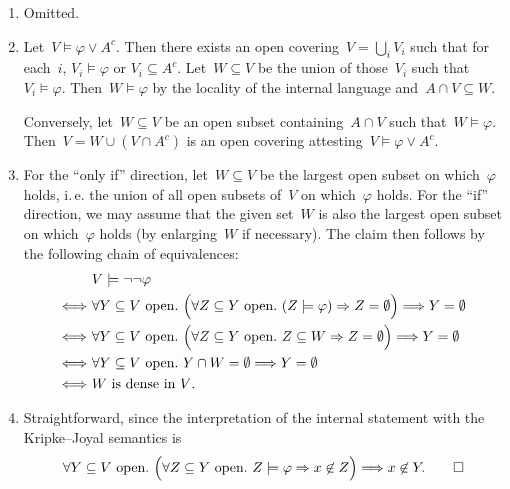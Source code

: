 \documentclass[10pt,reqno,a4paper]{amsbook}
\makeatletter
\theoremstyle{definition}
\theoremstyle{plain}
\theoremstyle{remark}
\newcommand{\?}{\,{:}\,}
\renewcommand{\_}{\mathpunct{.}\,}
\newcommand{\ie}{i.\,e.\@\xspace}
\renewenvironment{proof}[1][\proofname]{\par
  \pushQED{\qed}%
  \normalfont \topsep6\p@\@plus6\p@\relax
  \trivlist
  \item[\hskip\labelsep
        \itshape
    #1\@addpunct{.}]\ignorespaces
}{%
  \popQED\endtrivlist\@endpefalse
}
\makeatother
\begin{document}
\begin{proof}
\begin{enumerate}
\item Omitted.

\item Let~$V \models \varphi \vee A^c$. Then there exists an open covering~$V =
\bigcup_i V_i$ such that for each~$i$, $V_i \models \varphi$ or $V_i \subseteq
A^c$. Let~$W \subseteq V$ be the union of those~$V_i$ such that~$V_i \models \varphi$.
Then~$W \models \varphi$ by the locality of the internal language and~$A \cap V
\subseteq W$.

Conversely, let~$W \subseteq V$ be an open subset containing~$A \cap V$ such
that~$W \models \varphi$. Then~$V = W \cup (V \cap A^c)$ is an open covering
attesting~$V \models \varphi \vee A^c$.

\item For the ``only if'' direction, let~$W \subseteq V$ be the largest
open subset on which~$\varphi$ holds, \ie the union of all open subsets
of~$V$ on which~$\varphi$ holds. For the ``if'' direction, we may assume that
the given set~$W$ is also the largest open subset on which~$\varphi$ holds (by
enlarging~$W$ if necessary). The claim then follows by the following chain of
equivalences:
\begin{align*}
  &\ V \models \neg\neg\varphi \\
  \Longleftrightarrow&\ \forall \text{$Y \subseteq V$ open}\_
    \Bigl(\forall \text{$Z \subseteq Y$ open}\_ (Z \models \varphi) \Rightarrow Z
    = \emptyset\Bigr) \Longrightarrow Y = \emptyset \\
  \Longleftrightarrow&\ \forall \text{$Y \subseteq V$ open}\_
    \Bigl(\forall \text{$Z \subseteq Y$ open}\_ Z \subseteq W \Rightarrow Z
    = \emptyset\Bigr) \Longrightarrow Y = \emptyset \\
  \Longleftrightarrow&\ \forall \text{$Y \subseteq V$ open}\_
    Y \cap W = \emptyset \Longrightarrow Y = \emptyset \\
  \Longleftrightarrow&\ \text{$W$ is dense in~$V$.}
\end{align*}

\item Straightforward, since the interpretation of the internal statement with
the Kripke--Joyal semantics is
\[ \forall \text{$Y \subseteq V$ open}\_
  \Bigl(\forall \text{$Z \subseteq Y$ open}\_
    Z \models \varphi \Rightarrow x \not\in Z\Bigr) \Longrightarrow x \not\in
    Y. \qedhere \]
\end{enumerate}
\end{proof}
\end{document}
